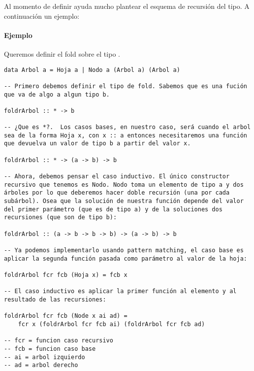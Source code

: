 Al momento de definir  ayuda mucho plantear el esquema de recursión del tipo. A continuación un ejemplo:

\paragraph{Ejemplo} Queremos definir el fold sobre el tipo .

\begin{centrado}
\begin{verbatim}
data Arbol a = Hoja a | Nodo a (Arbol a) (Arbol a)

-- Primero debemos definir el tipo de fold. Sabemos que es una fución que va de algo a algun tipo b.

foldrArbol :: * -> b

-- ¿Que es *?.  Los casos bases, en nuestro caso, será cuando el arbol sea de la forma Hoja x, con x :: a entonces necesitaremos una función que devuelva un valor de tipo b a partir del valor x.

foldrArbol :: * -> (a -> b) -> b

-- Ahora, debemos pensar el caso inductivo. El único constructor recursivo que tenemos es Nodo. Nodo toma un elemento de tipo a y dos árboles por lo que deberemos hacer doble recursión (una por cada subárbol). Osea que la solución de nuestra función depende del valor del primer parámetro (que es de tipo a) y de la soluciones dos recursiones (que son de tipo b):

foldrArbol :: (a -> b -> b -> b) -> (a -> b) -> b

-- Ya podemos implementarlo usando pattern matching, el caso base es aplicar la segunda función pasada como parámetro al valor de la hoja:

foldrArbol fcr fcb (Hoja x) = fcb x 

-- El caso inductivo es aplicar la primer función al elemento y al resultado de las recursiones:

foldrArbol fcr fcb (Node x ai ad) = 
	fcr x (foldrArbol fcr fcb ai) (foldrArbol fcr fcb ad)

-- fcr = funcion caso recursivo
-- fcb = funcion caso base
-- ai = arbol izquierdo
-- ad = arbol derecho
\end{verbatim}
\end{centrado}